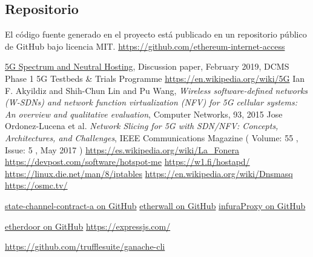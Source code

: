 \documentclass[12pt]{amsart}
\begin{document}
\begin{multicols}{2}
\section{Repositorio}\label{sec:repository}
El código fuente generado en el proyecto está publicado en un repositorio público de GitHub bajo licencia MIT.
\newline\newline
\url{https://github.com/ethereum-internet-access}
\newline
\begin{thebibliography}{9}
  \href{https://uk5g.org/media/uploads/resource_files/Spectrum\_NH\_discussion\_paper\_20Feb19.pdf}{5G Spectrum and Neutral Hosting}, Discussion paper, February 2019,
  DCMS Phase 1 5G Testbeds \& Trials Programme
 \href{https://en.wikipedia.org/wiki/5G}{https://en.wikipedia.org/wiki/5G}
 Ian F. Akyildiz and Shih-Chun Lin and Pu Wang,
  \textit{Wireless software-defined networks (W-SDNs) and network function virtualization (NFV) for 5G cellular systems:
    An overview and qualitative evaluation}, Computer Networks, 93, 2015
 Jose Ordonez-Lucena et al.
  \textit{Network Slicing for 5G with SDN/NFV: Concepts, Architectures, and Challenges},
   IEEE Communications Magazine ( Volume: 55 , Issue: 5 , May 2017 )
 \href{https://es.wikipedia.org/wiki/La_Fonera}{https://es.wikipedia.org/wiki/La\_Fonera}
 \href{https://devpost.com/software/hotspot-me}{https://devpost.com/software/hotspot-me}
 \href{https://w1.fi/hostapd/}{https://w1.fi/hostapd/}
 \href{https://linux.die.net/man/8/iptables}{https://linux.die.net/man/8/iptables}
 \href{https://en.wikipedia.org/wiki/Dnsmasq}{https://en.wikipedia.org/wiki/Dnsmasq}
 \href{https://osmc.tv/}{https://osmc.tv/}

  \href{https://github.com/ethereum-internet-access/state-channel-contract-a}{state-channel-contract-a on GitHub}
  \href{https://github.com/ethereum-internet-access/etherwall}{etherwall on GitHub}
  \href{https://github.com/ethereum-internet-access/etherwall/blob/master/infuraProxy.js}{infuraProxy on GitHub}

  \href{https://github.com/ethereum-internet-access/etherdoor}{etherdoor on GitHub}
  \href{https://expressjs.com/}{https://expressjs.com/}

  \href{https://github.com/trufflesuite/ganache-cli}{https://github.com/trufflesuite/ganache-cli}


\end{thebibliography}
\end{multicols}
\end{document}
